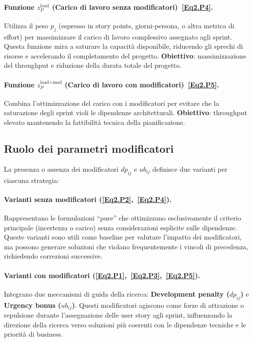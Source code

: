 \documentclass[12pt,a4paper,openright,twoside]{book}
\begin{document}
\paragraph{Funzione \texorpdfstring{$z_P^\text{load}$}{z\_P\^{}load} (Carico di lavoro senza modificatori)~\eqref{Eq2.P4}.}
Utilizza il peso $p_j$ (espresso in story points, giorni-persona, o altra metrica di effort) per massimizzare il carico di lavoro complessivo assegnato agli sprint. Questa funzione mira a saturare la capacità disponibile, riducendo gli sprechi di risorse e accelerando il completamento del progetto. \textbf{Obiettivo}: massimizzazione del throughput e riduzione della durata totale del progetto.

\paragraph{Funzione \texorpdfstring{$z_P^\text{load+mod}$}{z\_P\^{}load+mod} (Carico di lavoro con modificatori)~\eqref{Eq2.P5}.}
Combina l'ottimizzazione del carico con i modificatori per evitare che la saturazione degli sprint violi le dipendenze architetturali. \textbf{Obiettivo}: throughput elevato mantenendo la fattibilità tecnica della pianificazione.

\subsection{Ruolo dei parametri modificatori}

La presenza o assenza dei modificatori $dp_{ij}$ e $ub_{ij}$ definisce due varianti per ciascuna strategia:

\paragraph{Varianti senza modificatori (\eqref{Eq2.P2},~\eqref{Eq2.P4}).} 
Rappresentano le formulazioni ``pure'' che ottimizzano esclusivamente il criterio principale (incertezza o carico) senza considerazioni esplicite sulle dipendenze. Queste varianti sono utili come baseline per valutare l'impatto dei modificatori, ma possono generare soluzioni che violano frequentemente i vincoli di precedenza, richiedendo correzioni successive.

\paragraph{Varianti con modificatori (\eqref{Eq2.P1},~\eqref{Eq2.P3},~\eqref{Eq2.P5}).}
Integrano due meccanismi di guida della ricerca: \textbf{Development penalty ($dp_{ij}$)} e \textbf{Urgency bonus ($ub_{ij}$)}. Questi modificatori agiscono come forze di attrazione o repulsione durante l'assegnazione delle user story agli sprint, influenzando la direzione della ricerca verso soluzioni più coerenti con le dipendenze tecniche e le priorità di business.
\end{document}
